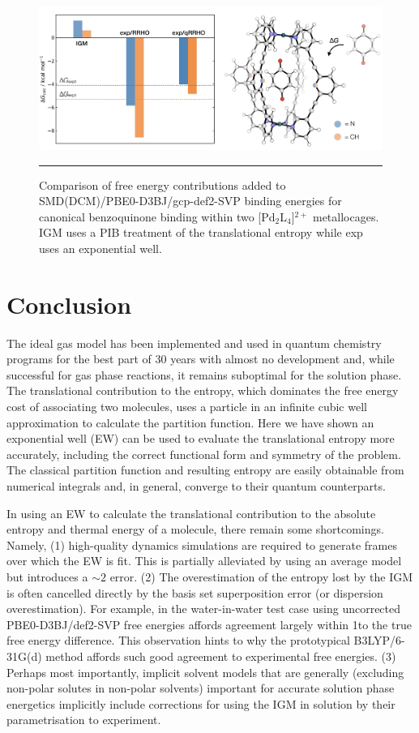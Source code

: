 \documentclass[../main.tex]{subfiles}
\begin{document}
\vspace{0.4cm}
\begin{figure}[h!]
	\centering
	\includegraphics[width=\textwidth]{4/figs/figX12/figX12}
	\vspace{0.2cm}
	\hrule
	\caption{Comparison of free energy contributions added to SMD(DCM)/PBE0-D3BJ/gcp-def2-SVP binding energies for canonical benzoquinone binding within two [Pd$_2$L$_4$]${}^{2+}$ metallocages. IGM uses a PIB treatment of the translational entropy while exp uses an exponential well.} 
	\label{fig::entropy_X12}
\end{figure}


\clearpage
\section{Conclusion}

The ideal gas model has been implemented and used in quantum chemistry programs for the best part of 30 years with almost no development and, while successful for gas phase reactions, it remains suboptimal for the solution phase. The translational contribution to the entropy, which dominates the free energy cost of associating two molecules, uses a particle in an infinite cubic well approximation to calculate the partition function. Here we have shown an exponential well (EW) can be used to evaluate the translational entropy more accurately, including the correct functional form and symmetry of the problem. The classical partition function and resulting entropy are easily obtainable from numerical integrals and, in general, converge to their quantum counterparts. 

In using an EW to calculate the translational contribution to the absolute entropy and thermal energy of a molecule, there remain some shortcomings. Namely, (1) high-quality dynamics simulations are required to generate frames over which the EW is fit. This is partially alleviated by using an average model but introduces a $\sim 2$ \kcalx error. (2) The overestimation of the entropy lost by the IGM is often cancelled directly by the basis set superposition error (or dispersion overestimation). For example, in the water-in-water test case using uncorrected PBE0-D3BJ/def2-SVP free energies affords agreement largely within 1\kcalx to the true free energy difference. This observation hints to why the prototypical B3LYP/6-31G(d) method affords such good agreement to experimental free energies. (3) Perhaps most importantly, implicit solvent models that are generally (excluding non-polar solutes in non-polar solvents) important for accurate solution phase energetics implicitly include corrections for using the IGM in solution by their parametrisation to experiment.
\end{document}
